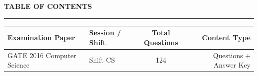 \documentclass[a4paper,10pt,twoside]{article}
\begin{document}
\newpage

\begin{center}
    {\Large\textbf{TABLE OF CONTENTS}}\\[0.4em]
    \rule{0.5\textwidth}{0.6pt}
\end{center}
\vspace{1em}

\noindent\begin{tabularx}{\linewidth}{|X|l|c|r|}
\hline
\textbf{Examination Paper} & \textbf{Session / Shift} & \textbf{Total Questions} & \textbf{Content Type} \\
\hline

GATE 2016 Computer Science & Shift CS & 124 & Questions + Answer Key \\ \hline
\end{tabularx}

\vspace{1.5em}

\newpage
\end{document}
